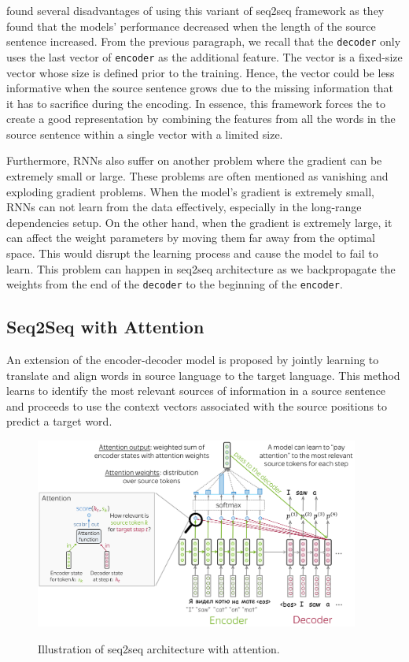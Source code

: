 \cite{cho2014properties} found several disadvantages of using this variant of seq2seq framework as they found that the models' performance decreased when the length of the source sentence increased.
From the previous paragraph, we recall that the \texttt{decoder} only uses the last vector of \texttt{encoder} as the additional feature.
The vector is a fixed-size vector whose size is defined prior to the training. Hence, the vector could be less informative when the source sentence grows due to the missing information that it has to sacrifice during the encoding. In essence, this framework forces the  to create a good representation by combining the features from all the words in the source sentence within a single vector with a limited size.


Furthermore, RNNs also suffer on another problem where the gradient can be extremely small or large. These problems are often mentioned as vanishing and exploding gradient problems. When the model's gradient is extremely small, RNNs can not learn from the data effectively, especially in the long-range dependencies setup. On the other hand, when the gradient is extremely large, it can affect the weight parameters by moving them far away from the optimal space. This would disrupt the learning process and cause the model to fail to learn. This problem can happen in seq2seq architecture as we backpropagate the weights from the end of the \texttt{decoder} to the beginning of the \texttt{encoder}.

\subsection{Seq2Seq with Attention}
An extension of the encoder-decoder model is proposed by jointly learning to translate and align words in source language to the target language\cite{bahdanau2015nmt}. This method learns to identify the most relevant sources of information in a source sentence and proceeds to use the context vectors associated with the source positions to predict a target word.

\begin{figure}[h]
    {\includegraphics[width=0.95\textwidth]{img/attseq2seq.png}}
    \centering
    \caption{Illustration of seq2seq architecture with attention\protect\footnotemark[2].}
    \label{img:attseq2seq}
\end{figure}

